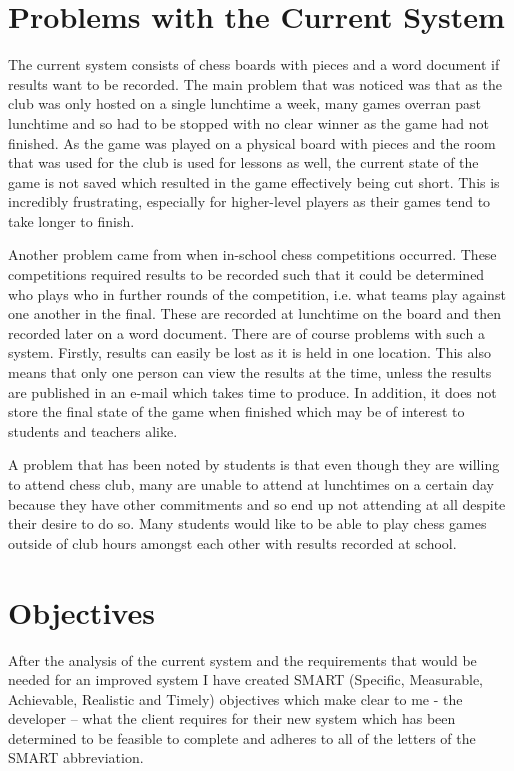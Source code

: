 \section{Problems with the Current System}
The current system consists of chess boards with pieces and a word document if results want to be recorded. The main problem that was noticed was that as the club was only hosted on a single lunchtime a week, many games overran past lunchtime and so had to be stopped with no clear winner as the game had not finished. As the game was played on a physical board with pieces and the room that was used for the club is used for lessons as well, the current state of the game is not saved which resulted in the game effectively being cut short. This is incredibly frustrating, especially for higher-level players as their games tend to take longer to finish. 

Another problem came from when in-school chess competitions occurred. These competitions required results to be recorded such that it could be determined who plays who in further rounds of the competition, i.e. what teams play against one another in the final. These are recorded at lunchtime on the board and then recorded later on a word document. There are of course problems with such a system. Firstly, results can easily be lost as it is held in one location. This also means that only one person can view the results at the time, unless the results are published in an e-mail which takes time to produce. In addition, it does not store the final state of the game when finished which may be of interest to students and teachers alike.

A problem that has been noted by students is that even though they are willing to attend chess club, many are unable to attend at lunchtimes on a certain day because they have other commitments and so end up not attending at all despite their desire to do so. Many students would like to be able to play chess games outside of club hours amongst each other with results recorded at school.
\section{Objectives} \label{objectives}
After the analysis of the current system and the requirements that would be needed for an improved system I have created SMART (Specific, Measurable, Achievable, Realistic and Timely) objectives which make clear to me - the developer – what the client requires for their new system which has been determined to be feasible to complete and adheres to all of the letters of the SMART abbreviation.

